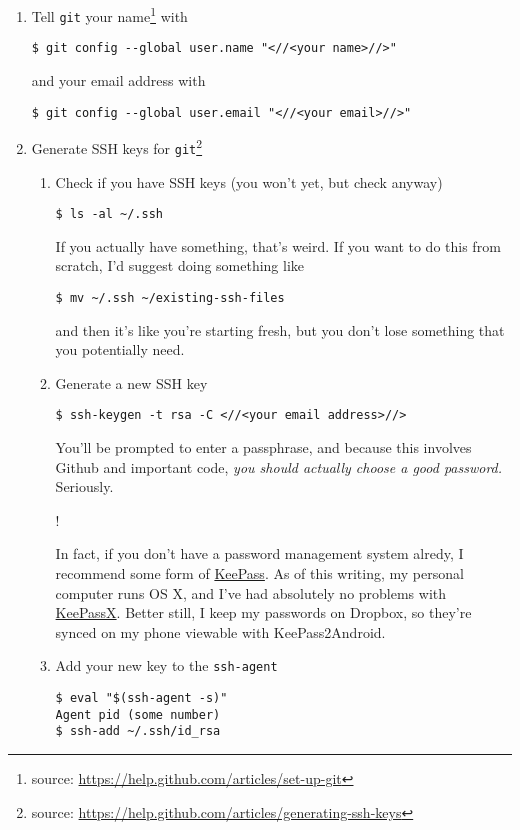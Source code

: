 \documentclass[12pt,letterpaper]{article}
\newenvironment{seriously}{%
  \begin{center}%
	\begin{minipage}[c]{2em}\Huge !\end{minipage}%
	\begin{minipage}[c]{0.75\textwidth}%
	  \noindent}
	{%
	\end{minipage}%
  \end{center}%
  \ignorespacesafterend}
\begin{document}
\begin{enumerate}
  \item Tell \lstinline{git} your name\footnote{source: \url{https://help.github.com/articles/set-up-git}} with
	\begin{lstlisting}
$ git config --global user.name "<//<your name>//>"
    \end{lstlisting}
	and your email address with
	\begin{lstlisting}
$ git config --global user.email "<//<your email>//>"
    \end{lstlisting}
  \item Generate SSH keys for \lstinline{git}\footnote{source:
	  \url{https://help.github.com/articles/generating-ssh-keys}}
	\begin{enumerate}
	  \item Check if you have SSH keys (you won't yet, but check anyway)
		\begin{lstlisting}
$ ls -al ~/.ssh
        \end{lstlisting}
		If you actually have something, that's weird.  If you want to do this
		from scratch, I'd suggest doing something like
		\begin{lstlisting}
$ mv ~/.ssh ~/existing-ssh-files
        \end{lstlisting}
		and then it's like you're starting fresh, but you don't lose something
		that you potentially need.
	  \item Generate a new SSH key
		\begin{lstlisting}
$ ssh-keygen -t rsa -C <//<your email address>//>
        \end{lstlisting}
		You'll be prompted to enter a passphrase, and because this involves
		Github and important code, \emph{you should actually choose a good
		password.}  Seriously.
	  \begin{seriously}In fact, if you don't have a password management
		system alredy, I recommend some form of
		\href{http://keepass.info/}{KeePass}.  As of this writing, my personal
		computer runs OS X, and I've had absolutely no problems with
		\href{http://www.keepassx.org/}{KeePassX}.  Better still, I keep my
		passwords on Dropbox, so they're synced on my phone viewable with
		KeePass2Android.\end{seriously}
      \item Add your new key to the \lstinline{ssh-agent}
		\begin{lstlisting}
$ eval "$(ssh-agent -s)"
Agent pid (some number)
$ ssh-add ~/.ssh/id_rsa
        \end{lstlisting}

\end{enumerate}
\end{enumerate}
\end{document}
